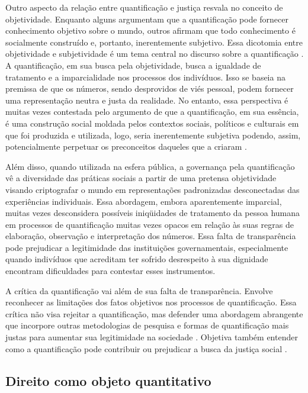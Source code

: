 Outro aspecto da relação entre quantificação e justiça resvala no conceito de objetividade. Enquanto alguns argumentam que a quantificação pode fornecer conhecimento objetivo sobre o mundo, outros afirmam que todo conhecimento é socialmente construído e, portanto, inerentemente subjetivo. Essa dicotomia entre objetividade e subjetividade é um tema central no discurso sobre a quantificação \cite{desrosieres2009real}. A quantificação, em sua busca pela objetividade, busca a igualdade de tratamento e a imparcialidade nos processos dos indivíduos. Isso se baseia na premissa de que os números, sendo desprovidos de viés pessoal, podem fornecer uma representação neutra e justa da realidade. No entanto, essa perspectiva é muitas vezes contestada pelo argumento de que a quantificação, em sua essência, é uma construção social moldada pelos contextos sociais, políticos e culturais em que foi produzida e utilizada, logo, seria inerentemente subjetiva podendo, assim, potencialmente perpetuar os preconceitos daqueles que a criaram \cite{desrosieres2009real}.

Além disso, quando utilizada na esfera pública, a governança pela quantificação vê a diversidade das práticas sociais a partir de uma pretensa objetividade visando criptografar o mundo em representações padronizadas desconectadas das experiências individuais. Essa abordagem, embora aparentemente imparcial, muitas vezes desconsidera possíveis iniqüidades de tratamento da pessoa humana em processos de quantificação muitas vezes opacos em relação às suas regras de elaboração, observação e interpretação dos números. Essa falta de transparência pode prejudicar a legitimidade das instituições governamentais, especialmente quando indivíduos que acreditam ter sofrido desrespeito à sua dignidade encontram dificuldades para contestar esses instrumentos.

A crítica da quantificação vai além de sua falta de transparência. Envolve reconhecer as limitações dos fatos objetivos nos processos de quantificação. Essa crítica não visa rejeitar a quantificação, mas defender uma abordagem abrangente que incorpore outras metodologias de pesquisa e formas de quantificação mais justas para aumentar sua legitimidade na sociedade \cite{salais2016quantificação}. Objetiva também entender como a quantificação pode contribuir ou prejudicar a busca da justiça social \cite{alonso1987politics}.

\subsection{Direito como objeto quantitativo}

